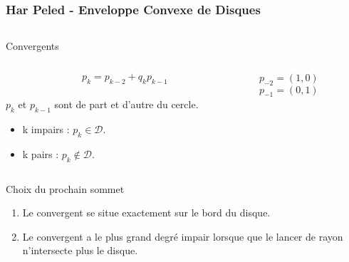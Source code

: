 \begin{frame}
\frametitle{Har Peled - Enveloppe Convexe de Disques}

\begin{columns}[t]
  \begin{column}{0.7\linewidth}
    \begin{block}{Convergents}
      
      \begin{columns}[t]
        \begin{column}{0.6\linewidth}
          \alert{$$p_{k} = p_{k-2} + q_k p_{k-1}$$}\\
          $p_{k}$ et $p_{k-1}$ sont de part et d'autre du cercle.
          \begin{itemize}
            \item k impairs : $p_k \in \mathcal{D}$.
            \item k pairs : $p_k \not\in \mathcal{D}$.
          \end{itemize}
        \end{column}
        \begin{column}{0.4\linewidth}
        $p_{-2} = (1,0)$\\
        $p_{-1} = (0,1)$\\
        \end{column}
      \end{columns}     
    \end{block}  
     \begin{block}{Choix du prochain sommet}   
      \begin{enumerate}
        \item Le convergent se situe exactement sur le bord du disque.
        \item Le convergent a le plus grand degré impair lorsque que le lancer de rayon n’intersecte plus le disque.
      \end{enumerate}
    \end{block}     
  \end{column}
  

\end{columns}
\end{frame}
